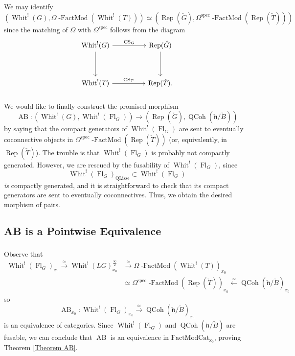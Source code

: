 \documentclass[10pt]{amsart}
\theoremstyle{remark}
\newcommand{\on}[1]{\operatorname{#1}}
\newcommand{\Gcheck}{\check{G}}
\newcommand{\ncheck}{\check{\mathfrak{n}}}
\newcommand{\Bcheck}{\check{B}}
\newcommand{\Tcheck}{\check{T}}
\newcommand{\FactModCat}{\on{FactModCat_{x_0}}}
\newcommand{\sssec}[1]{\subsubsection{}}
\begin{document}
\sssec{}
We may identify
$$
(\on{Whit}^!(G), \Omega \on{-FactMod}(\on{Whit}^!(T))) \simeq (\on{Rep}(\Gcheck), \Omega^{\on{spec}}\on{-FactMod}(\on{Rep}(\Tcheck)))
$$
since the matching of $\Omega$ with $\Omega^{\on{spec}}$ follows from the diagram
$$
\begin{tikzcd}
    {\on{Whit}^!(G)} && {\on{Rep}(\Gcheck)} \\
	\\
	{\on{Whit}^!(T)} && {\on{Rep}(\Tcheck).}
	\arrow["{\on{CS}_G}", from=1-1, to=1-3]
	\arrow[from=1-1, to=3-1]
	\arrow[from=1-3, to=3-3]
	\arrow["{\on{CS}_T}", from=3-1, to=3-3]
\end{tikzcd}
$$

\sssec{}
We would like to finally construct the promised morphism
$$
\on{AB}: (\on{Whit}^!(G), \on{Whit}^!(\on{Fl}_G)) \longrightarrow (\on{Rep}(\Gcheck), \on{QCoh}(\ncheck/\Bcheck))
$$
by saying that the compact generators of $\on{Whit}^!(\on{Fl}_G)$ are sent to eventually coconnective objects in $\Omega^{\on{spec}}\on{-FactMod}(\on{Rep}(\Tcheck))$ (or, equivalently, in $\on{Rep}(\Tcheck)$). The trouble is that $\on{Whit}^!(\on{Fl}_G)$ is probably not compactly generated. However, we are rescued by the fusability of $\on{Whit}^!(\on{Fl}_G)$, since
$$
\on{Whit}^!(\on{Fl}_G)_{\on{QLisse}} \subset \on{Whit}^!(\on{Fl}_G)
$$
\emph{is} compactly generated, and it is straightforward to check that its compact generators are sent to eventually coconnectives. Thus, we obtain the desired morphism of pairs.

\subsection{AB is a Pointwise Equivalence} \label{AB is a Pointwise Equivalence}
\sssec{}
Observe that 
\begin{align}
\on{Whit}^!(\on{Fl}_G)_{x_0} \overset{\simeq}{\to} \on{Whit}^!(LG)_{x_0}^{\frac{\infty}{2}} &\overset{\simeq}{\to} \Omega\on{-FactMod}(\on{Whit}^!(T))_{x_0} \\ &\simeq \Omega^{\on{spec}}\on{-FactMod}(\on{Rep}(\Tcheck))_{x_0} \overset{\simeq}{\longleftarrow} \on{QCoh}(\ncheck/\Bcheck)_{x_0}
\end{align}
so 
$$
\on{AB}_{x_0} : \on{Whit}^!(\on{Fl}_G)_{x_0} \overset{\simeq}{\longrightarrow} \on{QCoh}(\ncheck/\Bcheck)_{x_0}
$$
is an equivalence of categories. Since $\on{Whit}^!(\on{Fl}_G)$ and $\on{QCoh}(\ncheck/\Bcheck)$ are fusable, we can conclude that $\on{AB}$ is an equivalence in $\FactModCat$, proving Theorem \ref{Theorem AB}.
\end{document}
